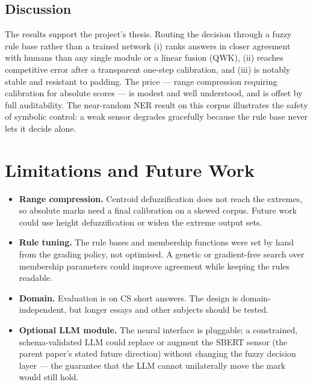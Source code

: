 \documentclass[11pt,a4paper]{article}
\begin{document}
\subsection{Discussion}

The results support the project's thesis. Routing the decision through a fuzzy
rule base rather than a trained network (i) ranks answers in closer agreement with
humans than any single module or a linear fusion (QWK), (ii) reaches competitive
error after a transparent one-step calibration, and (iii) is notably stable and
resistant to padding. The price --- range compression requiring calibration for
absolute scores --- is modest and well understood, and is offset by full
auditability. The near-random NER result on this corpus illustrates the safety of
symbolic control: a weak sensor degrades gracefully because the rule base never
lets it decide alone.

\newpage

\section{Limitations and Future Work}

\begin{itemize}[leftmargin=1.4em,itemsep=0.25em]
  \item \textbf{Range compression.} Centroid defuzzification does not reach the
  extremes, so absolute marks need a final calibration on a skewed corpus. Future
  work could use height defuzzification or widen the extreme output sets.
  \item \textbf{Rule tuning.} The rule bases and membership functions were set by
  hand from the grading policy, not optimised. A genetic or gradient-free search
  over membership parameters could improve agreement while keeping the rules
  readable.
  \item \textbf{Domain.} Evaluation is on CS short answers. The design is
  domain-independent, but longer essays and other subjects should be tested.
  \item \textbf{Optional LLM module.} The neural interface is pluggable; a
  constrained, schema-validated LLM could replace or augment the SBERT sensor
  (the parent paper's stated future direction) without changing the fuzzy
  decision layer --- the guarantee that the LLM cannot unilaterally move the mark
  would still hold.
\end{itemize}
\end{document}
